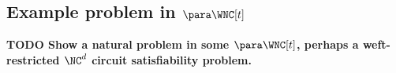 \documentclass{article}
\newcommand{\todo}[1]{\textbf{TODO #1}}
\begin{document}

\subsection{Example problem in \texorpdfstring{$\para \WNC[t]$}{paraWNC[t]}}

\todo{Show a natural problem in some $\para \WNC[t]$, perhaps a weft-restricted $\NC^d$ circuit satisfiability problem.}
\end{document}
